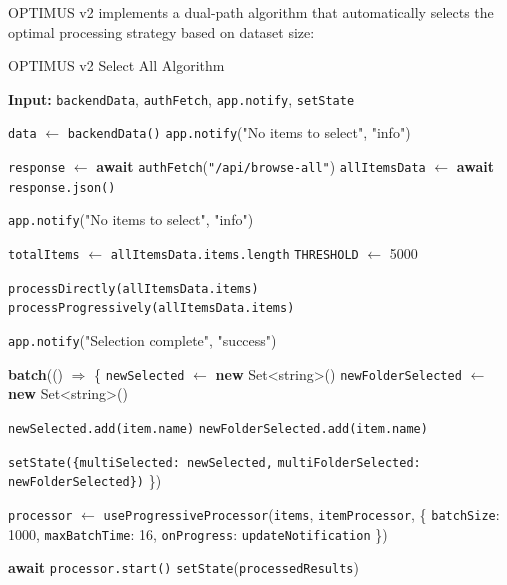 \documentclass[10pt]{article}
\begin{document}
OPTIMUS v2 implements a dual-path algorithm that automatically selects the optimal processing strategy based on dataset size:

\begin{algorithm}[H]
\caption{OPTIMUS v2 Select All Algorithm}
\label{algo:optimus-v2}
\begin{algorithmic}[1]
    \State \textbf{Input:} \texttt{backendData}, \texttt{authFetch}, \texttt{app.notify}, \texttt{setState}
    
    \State \texttt{data} $\gets$ \texttt{backendData()}
        \State \texttt{app.notify}("No items to select", "info")
        \State \Return
    \EndIf
    
    \State \texttt{response} $\gets$ \textbf{await} \texttt{authFetch}(\texttt{"/api/browse-all"})
    \State \texttt{allItemsData} $\gets$ \textbf{await} \texttt{response.json()}
    
        \State \texttt{app.notify}("No items to select", "info")
        \State \Return
    \EndIf
    
    \State \texttt{totalItems} $\gets$ \texttt{allItemsData.items.length}
    \State \texttt{THRESHOLD} $\gets$ 5000
    
        \State \texttt{processDirectly(allItemsData.items)}
    \Else
        \State \texttt{processProgressively(allItemsData.items)}
    \EndIf
    
    \State \texttt{app.notify}("Selection complete", "success")
\EndFunction

    \State \textbf{batch}(() $\Rightarrow$ \{
        \State \texttt{newSelected} $\gets$ \textbf{new} Set<string>()
        \State \texttt{newFolderSelected} $\gets$ \textbf{new} Set<string>()
        
                \State \texttt{newSelected.add(item.name)}
                \State \texttt{newFolderSelected.add(item.name)}
            \EndIf
        \EndFor
        
        \State \texttt{setState(\{multiSelected: newSelected,}
        \State \quad \texttt{multiFolderSelected: newFolderSelected\})}
    \State \})
\EndFunction

    \State \texttt{processor} $\gets$ \texttt{useProgressiveProcessor}(\texttt{items}, \texttt{itemProcessor}, \{
        \State \quad \texttt{batchSize}: 1000,
        \State \quad \texttt{maxBatchTime}: 16,
        \State \quad \texttt{onProgress}: \texttt{updateNotification}
    \State \})
    
    \State \textbf{await} \texttt{processor.start()}
    \State \texttt{setState}(\texttt{processedResults})
\EndFunction
\end{algorithmic}
\end{algorithm}
\end{document}
